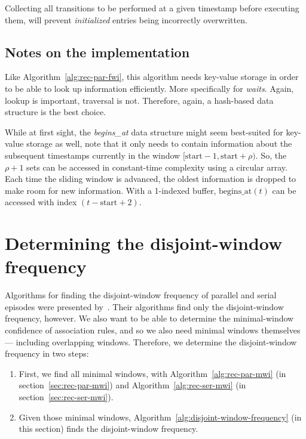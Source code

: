 Collecting all transitions to be performed at a given timestamp before executing them, will prevent \emph{initialized} entries being incorrectly overwritten.

\subsection{Notes on the implementation}

Like Algorithm~\ref{alg:rec-par-fwi}, this algorithm needs key-value storage in order to be able to look up information efficiently. More specifically for \emph{waits}. Again, lookup is important, traversal is not. Therefore, again, a hash-based data structure is the best choice.

While at first sight, the \emph{begins\_at} data structure might seem best-suited for key-value storage as well, note that it only needs to contain information about the subsequent timestamps currently in the window $ [\text{start} - 1, \text{start} + \rho) $. So, the $ \rho + 1 $ sets can be accessed in constant-time complexity using a circular array. Each time the sliding window is advanced, the oldest information is dropped to make room for new information. With a 1-indexed buffer, $ \text{begins\_at}(t) $ can be accessed with index $ (t - \text{start} + 2) $.


\section{Determining the disjoint-window frequency}
\label{sec:disjoint-window-frequency}

Algorithms for finding the disjoint-window frequency of parallel and serial episodes were presented by~\cite{laxman2007fast}. Their algorithms find only the disjoint-window frequency, however. We also want to be able to determine the minimal-window confidence of association rules, and so we also need minimal windows themselves --- including overlapping windows. Therefore, we determine the disjoint-window frequency in two steps:
\begin{enumerate}
\item \label{enum-item:find-all-minimal-windows} First, we find all minimal windows, with Algorithm~\ref{alg:rec-par-mwi} (in section~\ref{sec:rec-par-mwi}) and Algorithm~\ref{alg:rec-ser-mwi} (in section~\ref{sec:rec-ser-mwi}).
\item \label{enum-item:find-disjoint-window-frequency} Given those minimal windows, Algorithm~\ref{alg:disjoint-window-frequency} (in this section) finds the disjoint-window frequency.
\end{enumerate}

